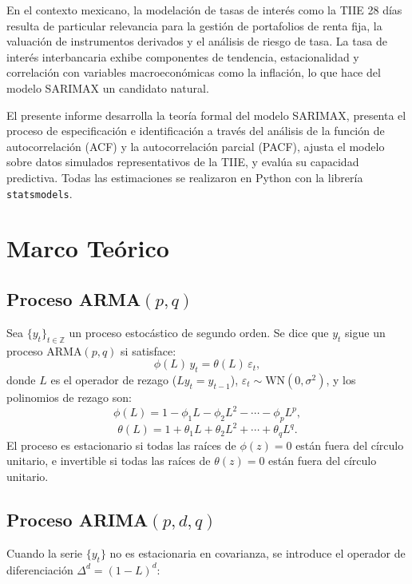 \documentclass[12pt, letterpaper]{article}
\begin{document}
En el contexto mexicano, la modelación de tasas de interés como la TIIE 28 días resulta de particular relevancia para la gestión de portafolios de renta fija, la valuación de instrumentos derivados y el análisis de riesgo de tasa. La tasa de interés interbancaria exhibe componentes de tendencia, estacionalidad y correlación con variables macroeconómicas como la inflación, lo que hace del modelo SARIMAX un candidato natural.

El presente informe desarrolla la teoría formal del modelo SARIMAX, presenta el proceso de especificación e identificación a través del análisis de la función de autocorrelación (ACF) y la autocorrelación parcial (PACF), ajusta el modelo sobre datos simulados representativos de la TIIE, y evalúa su capacidad predictiva. Todas las estimaciones se realizaron en Python con la librería \texttt{statsmodels}.

\section{Marco Teórico}

\subsection{Proceso ARMA$(p,q)$}

\begin{definicion}
Sea $\{y_t\}_{t\in\mathbb{Z}}$ un proceso estocástico de segundo orden. Se dice que $y_t$ sigue un proceso ARMA$(p,q)$ si satisface:
\[
  \phi(L)\,y_t = \theta(L)\,\varepsilon_t,
\]
donde $L$ es el operador de rezago ($Ly_t = y_{t-1}$), $\varepsilon_t \sim \text{WN}(0,\sigma^2)$, y los polinomios de rezago son:
\[
  \phi(L) = 1 - \phi_1 L - \phi_2 L^2 - \cdots - \phi_p L^p,
\]
\[
  \theta(L) = 1 + \theta_1 L + \theta_2 L^2 + \cdots + \theta_q L^q.
\]
El proceso es estacionario si todas las raíces de $\phi(z)=0$ están fuera del círculo unitario, e invertible si todas las raíces de $\theta(z)=0$ están fuera del círculo unitario.
\end{definicion}

\subsection{Proceso ARIMA$(p,d,q)$}

Cuando la serie $\{y_t\}$ no es estacionaria en covarianza, se introduce el operador de diferenciación $\Delta^d = (1-L)^d$:
\end{document}
